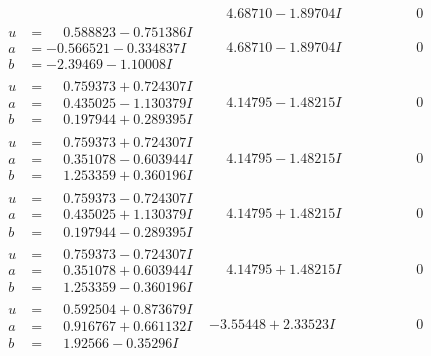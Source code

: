\documentclass[1p]{elsarticle_modified}
\theoremstyle{definition}
\begin{document}
$$\begin{array}{c|c|c}
 & \phantom{-}4.68710 - 1.89704 I & \phantom{-0.000000 } 0 \\ \hline\begin{aligned}
u &= \phantom{-}0.588823 - 0.751386 I \\
a &= -0.566521 - 0.334837 I \\
b &= -2.39469 - 1.10008 I\end{aligned}
 & \phantom{-}4.68710 - 1.89704 I & \phantom{-0.000000 } 0 \\ \hline\begin{aligned}
u &= \phantom{-}0.759373 + 0.724307 I \\
a &= \phantom{-}0.435025 - 1.130379 I \\
b &= \phantom{-}0.197944 + 0.289395 I\end{aligned}
 & \phantom{-}4.14795 - 1.48215 I & \phantom{-0.000000 } 0 \\ \hline\begin{aligned}
u &= \phantom{-}0.759373 + 0.724307 I \\
a &= \phantom{-}0.351078 - 0.603944 I \\
b &= \phantom{-}1.253359 + 0.360196 I\end{aligned}
 & \phantom{-}4.14795 - 1.48215 I & \phantom{-0.000000 } 0 \\ \hline\begin{aligned}
u &= \phantom{-}0.759373 - 0.724307 I \\
a &= \phantom{-}0.435025 + 1.130379 I \\
b &= \phantom{-}0.197944 - 0.289395 I\end{aligned}
 & \phantom{-}4.14795 + 1.48215 I & \phantom{-0.000000 } 0 \\ \hline\begin{aligned}
u &= \phantom{-}0.759373 - 0.724307 I \\
a &= \phantom{-}0.351078 + 0.603944 I \\
b &= \phantom{-}1.253359 - 0.360196 I\end{aligned}
 & \phantom{-}4.14795 + 1.48215 I & \phantom{-0.000000 } 0 \\ \hline\begin{aligned}
u &= \phantom{-}0.592504 + 0.873679 I \\
a &= \phantom{-}0.916767 + 0.661132 I \\
b &= \phantom{-}1.92566 - 0.35296 I\end{aligned}
 & -3.55448 + 2.33523 I & \phantom{-0.000000 } 0 \\ \hline\begin{aligned}

\end{aligned}
\end{array}$$
\end{document}
